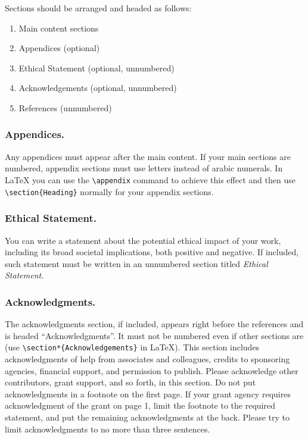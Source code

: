 Sections should be arranged and headed as follows:

\begin{enumerate}
\item Main content sections
\item Appendices (optional)
\item Ethical Statement (optional, unnumbered)
\item Acknowledgements (optional, unnumbered)
\item References (unnumbered)
\end{enumerate}

\subsubsection{Appendices.}

Any appendices must appear after the main content. If your main sections
are numbered, appendix sections must use letters instead of arabic
numerals. In \LaTeX{} you can use the \texttt{\textbackslash appendix}
command to achieve this effect and then use
\texttt{\textbackslash section\{Heading\}} normally for your appendix
sections.

\subsubsection{Ethical Statement.}

You can write a statement about the potential ethical impact of your
work, including its broad societal implications, both positive and
negative. If included, such statement must be written in an unnumbered
section titled \emph{Ethical Statement}.

\subsubsection{Acknowledgments.}

The acknowledgments section, if included, appears right before the
references and is headed ``Acknowledgments''. It must not be numbered
even if other sections are (use
\texttt{\textbackslash section*\{Acknowledgements\}} in \LaTeX{}). This
section includes acknowledgments of help from associates and colleagues,
credits to sponsoring agencies, financial support, and permission to
publish. Please acknowledge other contributors, grant support, and so
forth, in this section. Do not put acknowledgments in a footnote on the
first page. If your grant agency requires acknowledgment of the grant on
page 1, limit the footnote to the required statement, and put the
remaining acknowledgments at the back. Please try to limit
acknowledgments to no more than three sentences.

